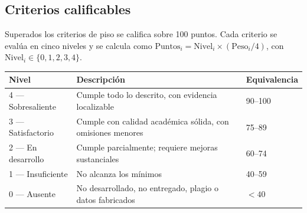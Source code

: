 \documentclass[11pt,a4paper]{article}
\begin{document}
	\subsection{Criterios calificables}
	
	Superados los criterios de piso se califica sobre 100 puntos. Cada criterio se evalúa en cinco niveles y se calcula como $\text{Puntos}_i = \text{Nivel}_i \times (\text{Peso}_i/4)$, con $\text{Nivel}_i \in \{0,1,2,3,4\}$.
	
	\begin{center}
		\small
		\begin{tabular}{@{}p{2.2cm}p{9.0cm}p{3.4cm}@{}}
			\toprule
			\textbf{Nivel} & \textbf{Descripción} & \textbf{Equivalencia} \\
			\midrule
			4 --- Sobresaliente & Cumple todo lo descrito, con evidencia localizable & 90--100 \\
			3 --- Satisfactorio & Cumple con calidad académica sólida, con omisiones menores & 75--89 \\
			2 --- En desarrollo & Cumple parcialmente; requiere mejoras sustanciales & 60--74 \\
			1 --- Insuficiente & No alcanza los mínimos & 40--59 \\
			0 --- Ausente & No desarrollado, no entregado, plagio o datos fabricados & $<40$ \\
			\bottomrule
		\end{tabular}
	\end{center}
	
\end{document}
